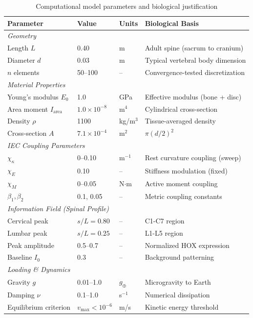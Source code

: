 \begin{table}[h!]
\centering
\caption{Computational model parameters and biological justification}
\label{tab:parameters}
\small
\begin{tabular}{llll}
\toprule
\textbf{Parameter} & \textbf{Value} & \textbf{Units} & \textbf{Biological Basis} \\
\midrule
\multicolumn{4}{l}{\textit{Geometry}} \\
Length $L$ & 0.40 & m & Adult spine (sacrum to cranium) \\
Diameter $d$ & 0.03 & m & Typical vertebral body dimension \\
$n$ elements & 50--100 & -- & Convergence-tested discretization \\
\midrule
\multicolumn{4}{l}{\textit{Material Properties}} \\
Young's modulus $E_0$ & 1.0 & GPa & Effective modulus (bone + disc) \\
Area moment $I_{\mathrm{area}}$ & $1.0 \times 10^{-8}$ & m$^4$ & Cylindrical cross-section \\
Density $\rho$ & 1100 & kg/m$^3$ & Tissue-averaged density \\
Cross-section $A$ & $7.1 \times 10^{-4}$ & m$^2$ & $\pi (d/2)^2$ \\
\midrule
\multicolumn{4}{l}{\textit{IEC Coupling Parameters}} \\
$\chi_\kappa$ & 0--0.10 & m$^{-1}$ & Rest curvature coupling (sweep) \\
$\chi_E$ & 0.10 & -- & Stiffness modulation (fixed) \\
$\chi_M$ & 0--0.05 & N$\cdot$m & Active moment coupling \\
$\beta_1, \beta_2$ & 0.1, 0.05 & -- & Metric coupling constants \\
\midrule
\multicolumn{4}{l}{\textit{Information Field (Spinal Profile)}} \\
Cervical peak & $s/L = 0.80$ & -- & C1-C7 region \\
Lumbar peak & $s/L = 0.25$ & -- & L1-L5 region \\
Peak amplitude & 0.5--0.7 & -- & Normalized HOX expression \\
Baseline $I_0$ & 0.3 & -- & Background patterning \\
\midrule
\multicolumn{4}{l}{\textit{Loading \& Dynamics}} \\
Gravity $g$ & 0.01--1.0 & $g_\oplus$ & Microgravity to Earth \\
Damping $\nu$ & 0.1--1.0 & s$^{-1}$ & Numerical dissipation \\
Equilibrium criterion & $v_{\max} < 10^{-6}$ & m/s & Kinetic energy threshold \\
\bottomrule
\end{tabular}
\end{table}

